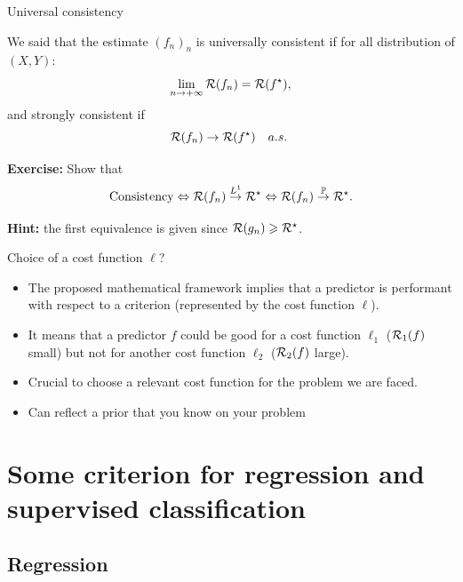\documentclass[xcolor={usenames,dvipsnames},handout]{beamer}
\begin{document}
\begin{frame}{Universal consistency}
\begin{definition}
We said that the estimate $(f_n)_n$ is \alert{universally consistent} if for all distribution of $(X,Y)$:
$$
\lim_{n\to + \infty} {\mathcal{R}}(f_n) = {\mathcal{R}} (f^\star),
$$
and \alert{strongly consistent} if
$$
{\mathcal{R}}(f_n) \to {\mathcal{R}}(f^\star) \quad a.s.\
$$
\end{definition}

\textbf{Exercise:}
Show that
$$
\text{Consistency} \Leftrightarrow {\mathcal{R}}(f_n) \overset{L^1}{\to} {\mathcal{R}}^\star \Leftrightarrow {\mathcal{R}}(f_n) \overset{\mathbb{P}}{\to} {\mathcal{R}}^\star.
$$


\textbf{Hint:} the first equivalence is given since ${\mathcal{R}}(g_n) \geqslant {\mathcal{R}}^\star$. \\


\end{frame}

\begin{frame}{Choice of a cost function $\ell$?}
\begin{itemize}
\item The proposed mathematical framework implies that a predictor is performant with respect to a criterion (represented by the cost function $\ell$).
\item  It means that a predictor $f$ could be good for a cost function $\ell_1$ (${\mathcal{R}}_1(f)$ small) but not for another cost function $\ell_2$ (${\mathcal{R}}_2(f)$ large).
\end{itemize}
\pause

\begin{alertblock}{}
\begin{itemize}
\item Crucial to choose a \alert{relevant} cost function for the problem we are faced.
\item Can reflect a \alert{prior} that you know on your problem
\end{itemize}
\end{alertblock}

\end{frame}

\section{Some criterion for regression and supervised classification}

\subsection{Regression}
\end{document}
